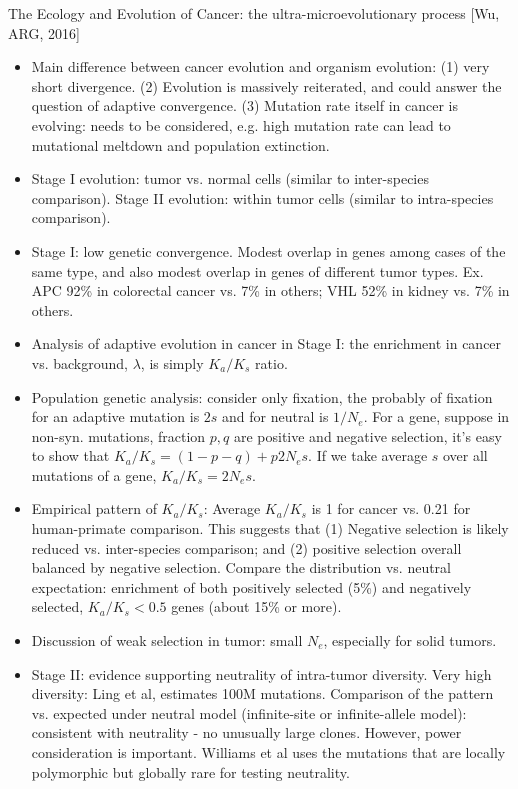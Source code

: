 \documentclass{report}
\begin{document}
The Ecology and Evolution of Cancer: the ultra-microevolutionary process [Wu, ARG, 2016]
\begin{itemize}
	
	\item Main difference between cancer evolution and organism evolution: (1) very short divergence. (2) Evolution is massively reiterated, and could answer the question of adaptive convergence. (3) Mutation rate itself in cancer is evolving: needs to be considered, e.g. high mutation rate can lead to mutational meltdown and population extinction.
	
	\item Stage I evolution: tumor vs. normal cells (similar to inter-species comparison). Stage II evolution: within tumor cells (similar to intra-species comparison).
	
	\item Stage I: low genetic convergence. Modest overlap in genes among cases of the same type, and also modest overlap in genes of different tumor types. Ex. APC 92\% in colorectal cancer vs. 7\% in others; VHL 52\% in kidney vs. 7\% in others.
	
	\item Analysis of adaptive evolution in cancer in Stage I: the enrichment in cancer vs. background, $\lambda$, is simply $K_a/K_s$ ratio.
	
	\item Population genetic analysis: consider only fixation, the probably of fixation for an adaptive mutation is $2s$ and for neutral is $1/N_e$. For a gene, suppose in non-syn. mutations, fraction $p,q$ are positive and negative selection, it’s easy to show that $K_a/K_s = (1-p-q) + p 2N_e s$. If we take average $s$ over all mutations of a gene, $K_a / K_s = 2 N_e s$.
	
	\item Empirical pattern of $K_a/K_s$: Average $K_a/K_s$ is 1 for cancer vs. 0.21 for human-primate comparison. This suggests that (1) Negative selection is likely reduced vs. inter-species comparison; and (2) positive selection overall balanced by negative selection. Compare the distribution vs. neutral expectation: enrichment of both positively selected (5\%) and negatively selected, $K_a/K_s < 0.5$ genes (about 15\% or more).
	
	\item Discussion of weak selection in tumor: small $N_e$, especially for solid tumors.
	
	\item Stage II: evidence supporting neutrality of intra-tumor diversity. Very high diversity: Ling et al, estimates 100M mutations. Comparison of the pattern vs. expected under neutral model (infinite-site or infinite-allele model): consistent with neutrality - no unusually large clones. However, power consideration is important. Williams et al uses the mutations that are locally polymorphic but globally rare for testing neutrality.
	

\end{itemize}
\end{document}
